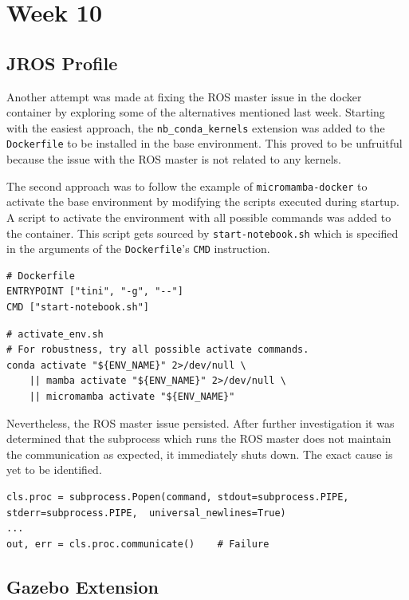 \chapter{Week 10}

\section{JROS Profile}

    Another attempt was made at fixing the ROS master issue in the docker container by exploring some of the alternatives mentioned last week. Starting with the easiest approach, the \texttt{nb\_conda\_kernels} extension was added to the \texttt{Dockerfile} to be installed in the base environment. This proved to be unfruitful because the issue with the ROS master is not related to any kernels. 

    The second approach was to follow the example of \texttt{micromamba-docker} to activate the base environment by modifying the scripts executed during startup. A script to activate the environment with all possible commands was added to the container. This script gets sourced by \texttt{start-notebook.sh} which is specified in the arguments of the \texttt{Dockerfile}'s \texttt{CMD} instruction.

    \begin{lstlisting}[language=docker]
# Dockerfile
ENTRYPOINT ["tini", "-g", "--"]
CMD ["start-notebook.sh"]
    \end{lstlisting}

    \begin{lstlisting}
# activate_env.sh
# For robustness, try all possible activate commands.
conda activate "${ENV_NAME}" 2>/dev/null \
    || mamba activate "${ENV_NAME}" 2>/dev/null \
    || micromamba activate "${ENV_NAME}"
    \end{lstlisting}

    \noindent Nevertheless, the ROS master issue persisted. After further investigation it was determined that the subprocess which runs the ROS master does not maintain the communication as expected, it immediately shuts down. The exact cause is yet to be identified.

    \begin{lstlisting}
cls.proc = subprocess.Popen(command, stdout=subprocess.PIPE, stderr=subprocess.PIPE,  universal_newlines=True)
...
out, err = cls.proc.communicate()    # Failure
    \end{lstlisting}


\section{Gazebo Extension}

